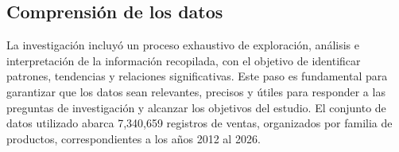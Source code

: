 		
		
		
		\subsection{Comprensión de los datos}
		La investigación incluyó un proceso exhaustivo de exploración, análisis e interpretación de la información recopilada, con el objetivo de identificar patrones, tendencias y relaciones significativas. Este paso es fundamental para garantizar que los datos sean relevantes, precisos y útiles para responder a las preguntas de investigación y alcanzar los objetivos del estudio. El conjunto de datos utilizado abarca 7,340,659 registros de ventas, organizados por familia de productos, correspondientes a los años 2012 al 2026. 
		
				
